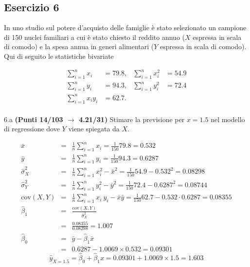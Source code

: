 \documentclass[
  11pt,
]{book}
\theoremstyle{mytheoremstyle}
\theoremstyle{mydefstyle}
\newenvironment{sol}
  {
  \begin{tcolorbox}[enhanced,breakable,arc=0.1mm,boxrule=1pt,colback=white,colframe=iblue,
  title=\bf \fontfamily{lmss}\selectfont \hspace{.5 cm} Soluzione,drop fuzzy shadow]

}{
\end{tcolorbox}
  }
\begin{document}
\subsection{Esercizio 6}\label{esercizio-6-19}

In uno studio sul potere d'acquisto delle famiglie è stato selezionato un campione di 150 nuclei familiari
a cui è stato chiesto il reddito annuo (\(X\) espressa in scala di comodo) e la spesa annua in generi alimentari (\(Y\) espressa in scala di comodo). Qui di seguito le statistiche bivariate

\begin{align*}
\sum_{i=1}^n x_i &= 79.8,   &\sum_{i=1}^n x_i^2 &= 54.9 \\
\sum_{i=1}^n y_i &= 94.3,   &\sum_{i=1}^n y_i^2 &= 72.4 \\
\sum_{i=1}^n x_iy_i &= 62.7.    \\
\end{align*}

6.a \textbf{(Punti 14/103 \(\rightarrow\) 4.21/31)} Stimare la previsione per \(x=1.5\) nel modello di regressione dove \(Y\) viene spiegata da \(X\).

\begin{sol}
\begin{eqnarray*}
           \bar x &=&\frac 1 n\sum_{i=1}^n x_i = \frac {1}{ 150 }  79.8 =  0.532 \\
           \bar y &=&\frac 1 n\sum_{i=1}^n y_i = \frac {1}{ 150 }  94.3 =  0.6287 \\
           \hat\sigma_X^2&=&\frac 1 n\sum_{i=1}^n x_i^2-\bar x^2=\frac {1}{ 150 }  54.9  - 0.532 ^2= 0.08298 \\
           \hat\sigma_Y^2&=&\frac 1 n\sum_{i=1}^n y_i^2-\bar y^2=\frac {1}{ 150 }  72.4  - 0.6287 ^2= 0.08744 \\
           \text{cov}(X,Y)&=&\frac 1 n\sum_{i=1}^n x_i~y_i-\bar x\bar y=\frac {1}{ 150 }  62.7 - 0.532 \cdot 0.6287 = 0.08355 \\
           \hat\beta_1 &=& \frac{\text{cov}(X,Y)}{\hat\sigma_X^2} \\
                    &=& \frac{ 0.08355 }{ 0.08298 }  =  1.007 \\
           \hat\beta_0 &=& \bar y - \hat\beta_1 \bar x\\
                    &=&  0.6287 - 1.0069 \times  0.532 = 0.09301 
         \end{eqnarray*}\[\hat y_{X= 1.5 }=\hat\beta_0+\hat\beta_1 x= 0.09301 + 1.0069 \times 1.5 = 1.603 \]

\end{sol}
\end{document}
